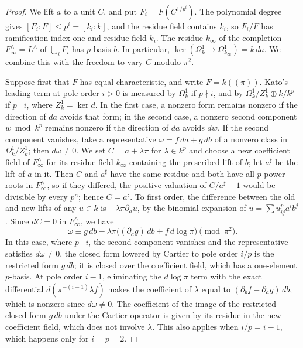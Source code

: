 \begin{proof}
We lift $a$ to a unit $C$, and put $F_i=F(C^{1/p^i})$.
The polynomial degree gives $[F_i:F]\le p^i=[k_i:k]$, and the residue field contains $k_i$, so $F_i/F$ has ramification index one and residue field $k_i$.
The residue $k_\infty$ of the completion $F_\infty^\wedge=L^\wedge$ of $\bigcup_i F_i$ has $p$-basis $b$.
In particular, $\ker(\Omega^1_k\to\Omega^1_{k_\infty})=k\,da$.
We combine this with the freedom to vary $C$ modulo $\pi^2$.

Suppose first that $F$ has equal characteristic, and write $F=k((\pi))$.
Kato's leading term at pole order $i>0$ is measured by $\Omega^1_k$ if $p\nmid i$, and by $\Omega^1_k/Z^1_k\oplus k/k^p$ if $p\mid i$, where $Z^1_k=\ker d$.
In the first case, a nonzero form remains nonzero if the direction of $da$ avoids that form; in the second case, a nonzero second component $w\bmod k^p$ remains nonzero if the direction of $da$ avoids $dw$.
If the second component vanishes, take a representative $\omega=f\,da+g\,db$ of a nonzero class in $\Omega^1_k/Z^1_k$; then $d\omega\ne0$.
We set $C=a+\lambda\pi$ for $\lambda\in k^p$ and choose a new coefficient field of $F_\infty^\wedge$ for its residue field $k_\infty$ containing the prescribed lift of $b$; let $a^\sharp$ be the lift of $a$ in it.
Then $C$ and $a^\sharp$ have the same residue and both have all $p$-power roots in $F_\infty^\wedge$, so if they differed, the positive valuation of $C/a^\sharp-1$ would be divisible by every $p^n$; hence $C=a^\sharp$.
To first order, the difference between the old and new lifts of any $u\in k$ is $-\lambda\pi\partial_a u$, by the binomial expansion of $u=\sum u_{ij}^p a^i b^j$.
Since $dC=0$ in $F_\infty^\wedge$, we have
\[
 \omega\equiv g\,db-\lambda\pi
       \bigl((\partial_a g)\,db+f\,d\log\pi\bigr)
       \pmod{\pi^2}.
\]
In this case, where $p\mid i$, the second component vanishes and the representative satisfies $d\omega\ne0$, the closed form lowered by Cartier to pole order $i/p$ is the restricted form $g\,db$; it is closed over the coefficient field, which has a one-element $p$-basis.
At pole order $i-1$, eliminating the $d\log\pi$ term with the exact differential $d(\pi^{-(i-1)}\lambda f)$ makes the coefficient of $\lambda$ equal to $(\partial_b f-\partial_a g)\,db$, which is nonzero since $d\omega\ne0$.
The coefficient of the image of the restricted closed form $g\,db$ under the Cartier operator is given by its residue in the new coefficient field, which does not involve $\lambda$.
This also applies when $i/p=i-1$, which happens only for $i=p=2$.


\end{proof}
